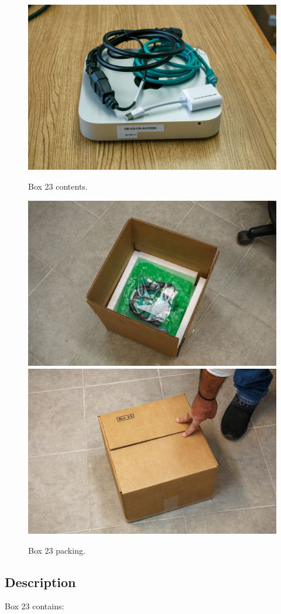 \documentclass{article}
\begin{document}
\begin{figure}[bp]
\begin{center}
\includegraphics[width=0.80\linewidth]{figures/20201207T141455.jpg}\\[\smallskipamount]
\end{center}
\caption{Box 23 contents.}
\label{figure:box-twenty-three-a}
\end{figure}

\begin{figure}[bp]
\begin{center}
\includegraphics[width=0.40\linewidth]{figures/20201207T142921.jpg}
\includegraphics[width=0.40\linewidth]{figures/20201207T143100.jpg}
\end{center}
\caption{Box 23 packing.}
\label{figure:box-twenty-three-b}
\end{figure}

\subsection{Description}

Box 23 contains:
\end{document}
